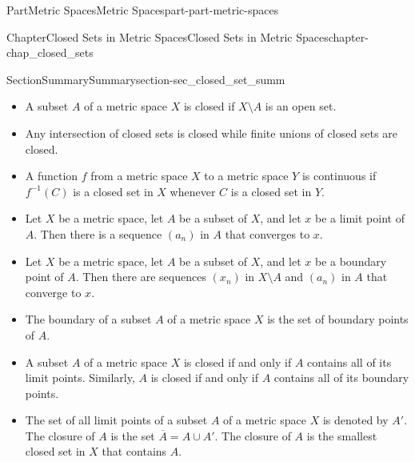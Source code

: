 \documentclass[oneside,10pt,]{book}
\numberwithin{equation}{chapter}
\newcommand{\R}{\mathbb{R}}
\begin{document}
\begin{partptx}{Part}{Metric Spaces}{}{Metric Spaces}{}{}{part-part-metric-spaces}
\begin{chapterptx}{Chapter}{Closed Sets in Metric Spaces}{}{Closed Sets in Metric Spaces}{}{}{chapter-chap_closed_sets}
\begin{sectionptx}{Section}{Summary}{}{Summary}{}{}{section-sec_closed_set_summ}
\begin{itemize}[label=\textbullet]
\begin{enumerate}[label=\roman*]
\item{}A point \(x\) is a limit point of \(A\) if every neighborhood of \(x\) contains a point in \(A\) different from \(x\).%
\item{}A point \(a \in A\) is an isolated point of \(A\) if there is a neighborhood \(N\) of \(a\) such that \(N \cap A = \{a\}\).%
\end{enumerate}
Boundary points and limit points don't need to be in the set \(A\), whereas an isolated point of \(A\) must be in \(A\). In \(A = (0,1) \cup \{2\}\) as a subset of \(=(\R, d_E)\), \(0\) is a boundary point but not an isolated point while \(2\) is a boundary point but not a limit point. Also, \(0.5\) is a limit point but neither a boundary or isolated point. With \(A\) as subset of \(\R\) with the discrete metric, every point of \(A\) is an isolated point but no point in \(\R\) is a boundary point or a limit point of \(A\). So even though every boundary point is either a limit point or an isolated point, the three concepts are different.%
\item{}A subset \(A\) of a metric space \(X\) is closed if \(X \setminus A\) is an open set.%
\item{}Any intersection of closed sets is closed while finite unions of closed sets are closed.%
\item{}A function \(f\) from a metric space \(X\) to a metric space \(Y\) is continuous if \(f^{-1}(C)\) is a closed set in \(X\) whenever \(C\) is a closed set in \(Y\).%
\item{}Let \(X\) be a metric space, let \(A\) be a subset of \(X\), and let \(x\) be a limit point of \(A\). Then there is a sequence \((a_n)\) in \(A\) that converges to \(x\).%
\item{}Let \(X\) be a metric space, let \(A\) be a subset of \(X\), and let \(x\) be a boundary point of \(A\). Then there are sequences \((x_n)\) in \(X \setminus A\) and \((a_n)\) in \(A\) that converge to \(x\).%
\item{}The boundary of a subset \(A\) of a metric space \(X\) is the set of boundary points of \(A\).%
\item{}A subset \(A\) of a metric space \(X\) is closed if and only if \(A\) contains all of its limit points. Similarly, \(A\) is closed if and only if \(A\) contains all of its boundary points.%
\item{}The set of all limit points of a subset \(A\) of a metric space \(X\) is denoted by \(A'\). The closure of \(A\) is the set \(\overline{A} = A \cup A'\). The closure of \(A\) is the smallest closed set in \(X\) that contains \(A\).%

\end{itemize}
\end{sectionptx}
\end{chapterptx}
\end{partptx}
\end{document}
